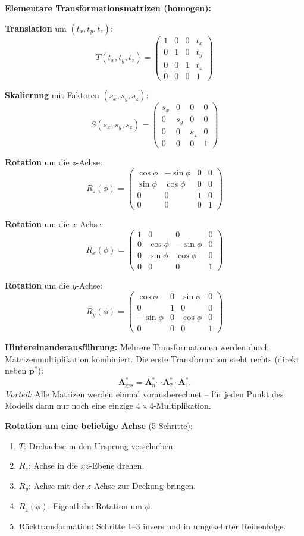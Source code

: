 \documentclass[12pt, a4paper]{article}
\begin{document}
\textbf{Elementare Transformationsmatrizen (homogen):}

\textbf{Translation} um $(t_x, t_y, t_z)$:
\[
  T(t_x,t_y,t_z) = \begin{pmatrix}1&0&0&t_x\\0&1&0&t_y\\0&0&1&t_z\\0&0&0&1\end{pmatrix}
\]

\textbf{Skalierung} mit Faktoren $(s_x, s_y, s_z)$:
\[
  S(s_x,s_y,s_z) = \begin{pmatrix}s_x&0&0&0\\0&s_y&0&0\\0&0&s_z&0\\0&0&0&1\end{pmatrix}
\]

\textbf{Rotation} um die $z$-Achse:
\[
  R_z(\phi) = \begin{pmatrix}\cos\phi&-\sin\phi&0&0\\\sin\phi&\cos\phi&0&0\\0&0&1&0\\0&0&0&1\end{pmatrix}
\]

\textbf{Rotation} um die $x$-Achse:
\[
  R_x(\phi) = \begin{pmatrix}1&0&0&0\\0&\cos\phi&-\sin\phi&0\\0&\sin\phi&\cos\phi&0\\0&0&0&1\end{pmatrix}
\]

\textbf{Rotation} um die $y$-Achse:
\[
  R_y(\phi) = \begin{pmatrix}\cos\phi&0&\sin\phi&0\\0&1&0&0\\-\sin\phi&0&\cos\phi&0\\0&0&0&1\end{pmatrix}
\]

\textbf{Hintereinanderausführung:} Mehrere Transformationen werden durch Matrizenmultiplikation kombiniert. Die erste Transformation steht rechts (direkt neben $\mathbf{p}^*$):
\[
  \mathbf{A}^*_{\text{ges}} = \mathbf{A}^*_n \cdots \mathbf{A}^*_2 \cdot \mathbf{A}^*_1.
\]
\textit{Vorteil:} Alle Matrizen werden einmal vorausberechnet -- für jeden Punkt des Modells dann nur noch eine einzige $4\times4$-Multiplikation.

\textbf{Rotation um eine beliebige Achse} (5 Schritte):
\begin{enumerate}
  \item $T$: Drehachse in den Ursprung verschieben.
  \item $R_z$: Achse in die $xz$-Ebene drehen.
  \item $R_y$: Achse mit der $z$-Achse zur Deckung bringen.
  \item $R_z(\phi)$: Eigentliche Rotation um $\phi$.
  \item Rücktransformation: Schritte 1--3 invers und in umgekehrter Reihenfolge.
\end{enumerate}
\end{document}
